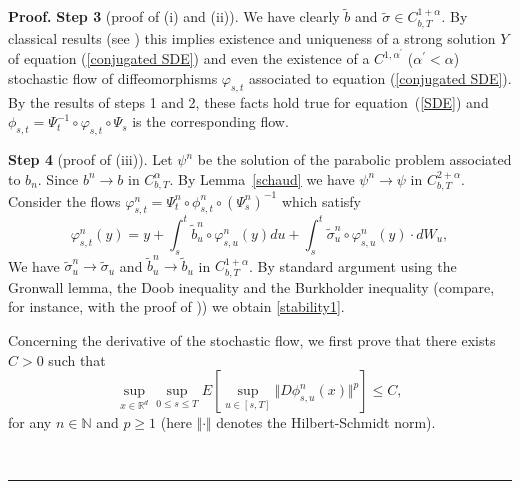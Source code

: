 \documentclass[a4paper,10pt]{article}
\newenvironment{proof}[1][Proof]{\textbf{#1.} }{\ \rule{0.5em}{0.5em}}
\begin{document}
\begin{proof}
\textbf{Step 3} (proof of (i) and (ii)). We have  clearly
$\widetilde{b}$ and $\widetilde{\sigma}\in C_{b,T}^{1+{\alpha}}$.
By classical results (see \cite[Chapter 2]{K}) this implies
existence and uniqueness of a strong solution $Y$ of equation
(\ref{conjugated SDE}) and even the existence of a
$C^{1,\alpha^{\prime}}$ ($\alpha^{\prime}<\alpha$) stochastic flow
of diffeomorphisms $\varphi_{s,t}$ associated to equation
(\ref{conjugated SDE}). By the results of steps 1 and 2, these
facts hold true for equation~(\ref{SDE}) and     $\phi_{s,t} =
\Psi^{-1}_t \circ \varphi_{s,t} \circ \Psi_s$ is the corresponding
flow.





\vskip 2mm \textbf{Step 4} (proof of (iii)). Let $\psi^{n}$ be the
solution of the parabolic problem associated to $b_{n}$. Since
$b^{n}\rightarrow b$ in $C_{b,T}^{\alpha}$. By Lemma~\ref{schaud}
we have $\psi^{n}\rightarrow\psi$ in $C_{b,T}^{2+{\alpha}}$.
Consider the flows $\varphi_{s,t}^{n}=\Psi
_{t}^{n}\circ\phi_{s,t}^{n}\circ(\Psi_{s}^{n})^{-1}$ which satisfy
\begin{equation}
\varphi_{s,t}^{n}(y)=y+\int_{s}^{t}\widetilde{b}_{u}^{n}\circ\varphi
_{s,u}^{n}(y)du+\int_{s}^{t}\widetilde{\sigma}_{u}^{n}\circ\varphi
_{s,u}^{n}(y)\cdot dW_{u},
\end{equation}
We have
$\widetilde{\sigma}_{u}^{n}\rightarrow\widetilde{\sigma}_{u}$
 and $\widetilde{b}_{u}^{n}\rightarrow\widetilde {b}_{u}$ in
$C_{b,T}^{1+{\alpha}}$. By standard argument using the Gronwall
lemma, the Doob inequality and the Burkholder inequality
%
%
%
%
%
%
%
(compare, for instance, with the proof of \cite[Theorem
II.2.1]{K})) we obtain \eqref{stability1}.
%
%
%
%
%
%
%

Concerning the derivative of the stochastic flow, we first prove
that
 there exists $C>0$ such that
\begin{equation}
\sup_{x\in{\mathbb{R}}^{d}} \sup_{0\leq s \leq T}  E[\sup_{u \in [s,T]}\Vert D\phi_{s,u}%
^{n}(x)\Vert^{p}]\leq C, \label{bound}
\end{equation}
for any $n\in \mathbb{N}$ and $p\geq 1$ (here $\Vert\cdot\Vert$
denotes the Hilbert-Schmidt norm).


\end{proof}
\end{document}
